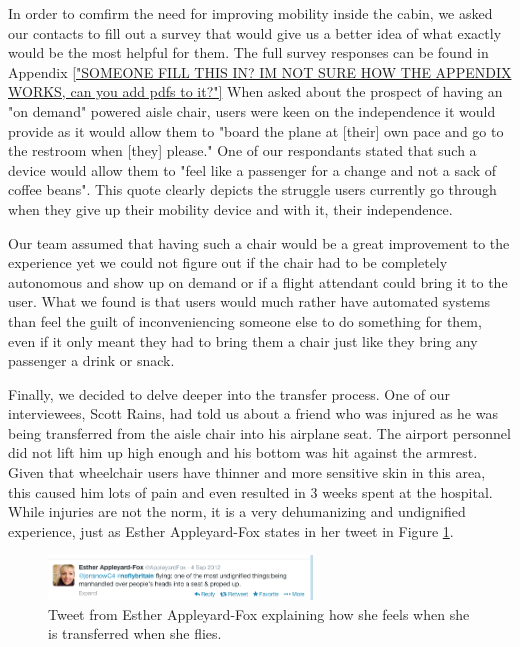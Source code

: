 In order to comfirm the need for improving mobility inside the cabin, we asked our contacts to fill out a survey that would give us a better idea of what exactly would be the most helpful for them. The full survey responses can be found in Appendix \ref{"SOMEONE FILL THIS IN? IM NOT SURE HOW THE APPENDIX WORKS, can you add pdfs to it?"} 
When asked about the prospect of having an "on demand"  powered aisle chair, users were keen on the independence it would provide as it would allow them to "board the plane at [their] own pace and go to the restroom when [they] please." One of our respondants stated that such a device would allow them to "feel like a passenger for a change and not a sack of coffee beans". This quote clearly depicts the struggle users currently go through when they give up their mobility device and with it, their independence.

Our team assumed that having such a chair would be a great improvement to the experience yet we could not figure out if the chair had to be completely autonomous and show up on demand or if a flight attendant could bring it to the user. What we found is that users would much rather have automated systems than feel the guilt of inconveniencing someone else to do something for them, even if it only meant they had to bring them a chair just like they bring any passenger a drink or snack. 

Finally, we decided to delve deeper into the transfer process. One of our interviewees, Scott Rains, had told us about a friend who was injured as he was being transferred from the aisle chair into his airplane seat. The airport personnel did not lift him up high enough and his bottom was hit against the armrest. Given that wheelchair users have thinner and more sensitive skin in this area, this caused him lots of pain and even resulted in 3 weeks spent at the hospital. While injuries are not the norm, it is a very dehumanizing and undignified experience, just as Esther Appleyard-Fox states in her tweet in Figure \ref{fig:MobilityTweet.png}. 


\begin{figure}[h]
  \centering
     \includegraphics[width=7cm]{images/MobilityTweet.png}
   \caption{Tweet from Esther Appleyard-Fox explaining how she feels when she is transferred when she flies. }
  \label{fig:MobilityTweet.png}
\end{figure}


